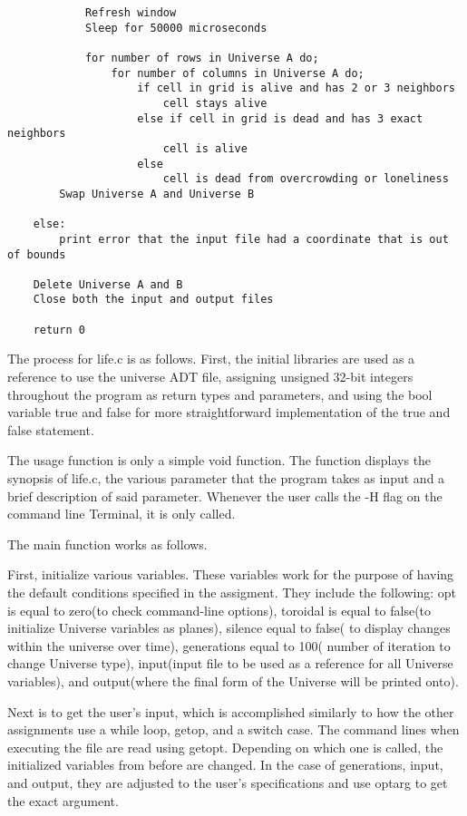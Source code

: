 \documentclass[11pt]{article} %
\begin{document}
\begin{flushleft}
\begin{lstlisting}
            Refresh window
            Sleep for 50000 microseconds
            
            for number of rows in Universe A do;
                for number of columns in Universe A do;
                    if cell in grid is alive and has 2 or 3 neighbors
                        cell stays alive
                    else if cell in grid is dead and has 3 exact neighbors
                        cell is alive
                    else
                        cell is dead from overcrowding or loneliness
        Swap Universe A and Universe B

    else:
        print error that the input file had a coordinate that is out of bounds

    Delete Universe A and B
    Close both the input and output files

    return 0
\end{lstlisting}
The process for life.c is as follows. First, the initial libraries are used as a reference to use the universe ADT file, assigning unsigned 32-bit integers throughout the program as return types and parameters, and using the bool variable true and false for more straightforward implementation of the true and false statement.

The usage function is only a simple void function. The function displays the synopsis of life.c, the various parameter that the program takes as input and a brief description of said parameter. Whenever the user calls the -H flag on the command line Terminal, it is only called.

The main function works as follows. 

First, initialize various variables. These variables work for the purpose of having the default conditions specified in the assigment. They include the following: opt is equal to zero(to check command-line options), toroidal is equal to false(to initialize Universe variables as planes), silence equal to false( to display changes within the universe over time), generations equal to 100( number of iteration to change Universe type), input(input file to be used as a reference for all Universe variables), and output(where the final form of the Universe will be printed onto). 

Next is to get the user’s input, which is accomplished similarly to how the other assignments use a while loop, getop, and a switch case. The command lines when executing the file are read using getopt. Depending on which one is called, the initialized variables from before are changed. In the case of generations, input, and output, they are adjusted to the user’s specifications and use optarg to get the exact argument.


\end{flushleft}
\end{document}
